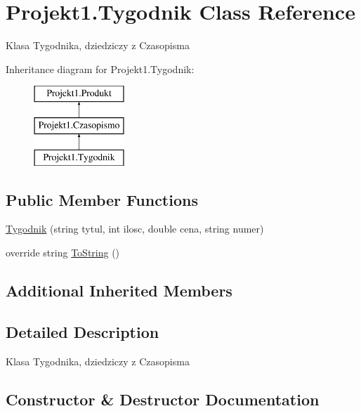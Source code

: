 \hypertarget{class_projekt1_1_1_tygodnik}{}\section{Projekt1.\+Tygodnik Class Reference}
\label{class_projekt1_1_1_tygodnik}


Klasa Tygodnika, dziedziczy z Czasopisma  


Inheritance diagram for Projekt1.\+Tygodnik\+:\begin{figure}[H]
\begin{center}
\leavevmode
\includegraphics[height=3.000000cm]{class_projekt1_1_1_tygodnik}
\end{center}
\end{figure}
\subsection*{Public Member Functions}
\begin{DoxyCompactItemize}
\item 
\mbox{\hyperlink{class_projekt1_1_1_tygodnik_a48810619b2eed532cddfaa00c6d30ff4}{Tygodnik}} (string tytul, int ilosc, double cena, string numer)
\item 
override string \mbox{\hyperlink{class_projekt1_1_1_tygodnik_aba6183aedf07444742b276d42c3e91a7}{To\+String}} ()
\end{DoxyCompactItemize}
\subsection*{Additional Inherited Members}


\subsection{Detailed Description}
Klasa Tygodnika, dziedziczy z Czasopisma 



\subsection{Constructor \& Destructor Documentation}
\mbox{\label{class_projekt1_1_1_tygodnik_a48810619b2eed532cddfaa00c6d30ff4}} 
